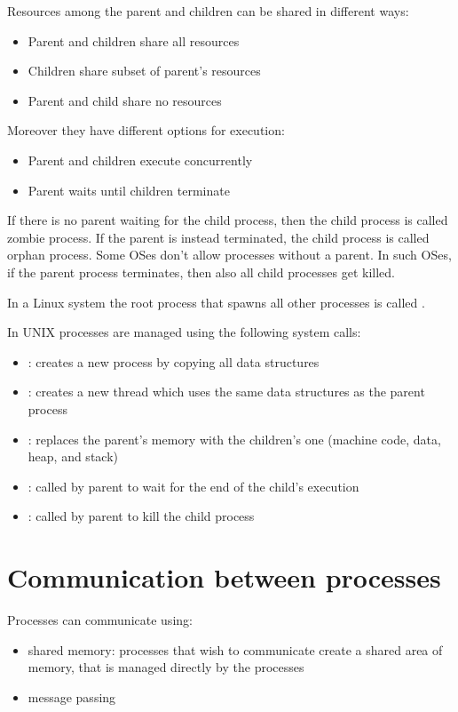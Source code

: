 Resources among the parent and children can be shared in different ways:
\begin{itemize}
  \item Parent and children share all resources
  \item Children share subset of parent's resources
  \item Parent and child share no resources
\end{itemize}

Moreover they have different options for execution:
\begin{itemize}
  \item Parent and children execute concurrently
  \item Parent waits until children terminate
\end{itemize}
If there is no parent waiting for the child process, then the child process is called zombie process. If the parent is instead terminated, the child process is called orphan process. Some OSes don't allow processes without a parent. In such OSes, if the parent process terminates, then also all child processes get killed.

In a Linux system the root process that spawns all other processes is called .

In UNIX processes are managed using the following system calls:
\begin{itemize}
  \item {}: creates a new process by copying all data structures
  \item {}: creates a new thread which uses the same data structures as the parent process
  \item {}: replaces the parent's memory with the children's one (machine code, data, heap, and stack)
  \item {}: called by parent to wait for the end of the child's execution
  \item {}: called by parent to kill the child process
\end{itemize}



\section{Communication between processes}
Processes can communicate using:
\begin{itemize}
  \item shared memory: processes that wish to communicate create a shared area of memory, that is managed directly by the processes
  \item message passing
\end{itemize}

